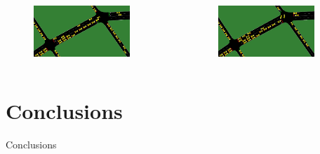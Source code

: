 \documentclass[dvipsnames]{beamer}
\begin{document}
\begin{frame}
  \begin{columns}
    \begin{column}{0.5\textwidth}
      \begin{figure}
        \centering
        \includegraphics[width=0.85\textwidth]{figures/dql-unshared.0.png}
      \end{figure}
    \end{column}
    \begin{column}{0.5\textwidth}
      \begin{figure}
        \centering
        \includegraphics[width=0.85\textwidth]{figures/dql-unshared.1.png}
      \end{figure}
    \end{column}
  \end{columns}
\end{frame}


\section{Conclusions}
\begin{frame}
\centering
\Huge
Conclusions
\end{frame}
\end{document}
